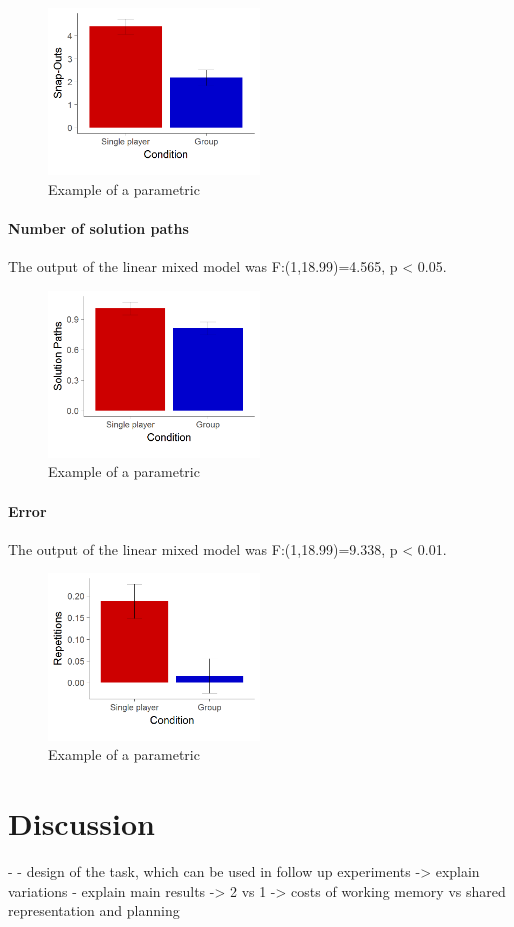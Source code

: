 \documentclass{article}
\begin{document}
\begin{figure}[h]
\centering
\includegraphics[width=0.5\textwidth]{results_snap_outs}
\caption{Example of a parametric }
\label{fig:results_snap_outs}
\end{figure}

\paragraph{Number of solution paths}

The output of the linear mixed model was F:(1,18.99)=4.565, p < 0.05.


\begin{figure}[h]
\centering
\includegraphics[width=0.5\textwidth]{results_solution_paths}
\caption{Example of a parametric }
\end{figure}

\paragraph{Error}

The output of the linear mixed model was F:(1,18.99)=9.338, p < 0.01.


\begin{figure}[h]
\centering
\includegraphics[width=0.5\textwidth]{results_un_error}
\caption{Example of a parametric }
\end{figure}


\section{Discussion}
- 
- design of the task, which can be used in follow up experiments -> explain variations
- explain main results -> 2 vs 1 -> costs of working memory vs shared representation and planning




\end{document}
